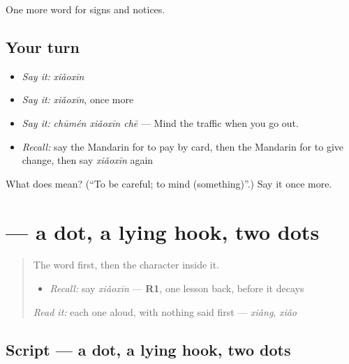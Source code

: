 \begin{grammarlens}[title={What you've built}]
One more word for signs and notices.
\end{grammarlens}

\subsection*{Your turn}
\begin{itemize}
\raggedright
  \item \emph{Say it:} \emph{xiǎoxīn}
  \item \emph{Say it:} \emph{xiǎoxīn}, once more
  \item \emph{Say it:} \emph{chūmén xiǎoxīn chē} — Mind the traffic when you go out.
  \item \emph{Recall:} say the Mandarin for to pay by card, then the Mandarin for to give change, then say \emph{xiǎoxīn} again
\end{itemize}

\begin{tcolorbox}[breakable,colback=teal!4,colframe=teal!35!black,title={Before you move on}]
What does  mean? (\textquotedblleft{}To be careful; to mind (something)\textquotedblright{}.) Say it once more.
\end{tcolorbox}
\section[\texorpdfstring{\zh{心} (xīn)}{心 (xīn)}]{ — a dot, a lying hook, two dots}

\label{lesson:ZH-W115-xin-heart}



\begin{quote}
The word first, then the character inside it.

\begin{itemize}
\raggedright
  \item \emph{Recall:} say \emph{xiǎoxīn} — \textbf{R1}, one lesson back, before it decays
\end{itemize}

\begin{quote}
 
\end{quote}

\emph{Read it:} each one aloud, with nothing said first — \emph{xiǎng}, \emph{xiǎo}
\end{quote}

\subsection*{Script — a dot, a lying hook, two dots}

